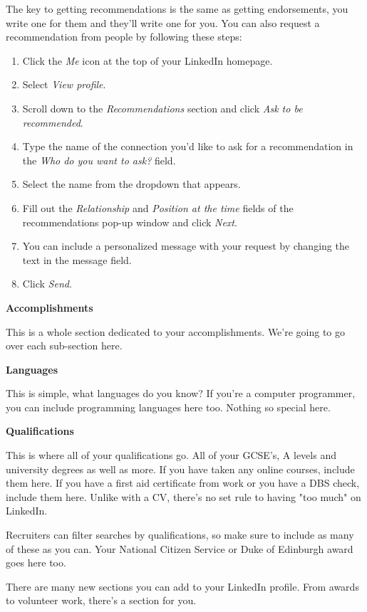 \documentclass{article}
\begin{document}
The key to getting recommendations is the same as getting endorsements,
you write one for them and they'll write one for you. You can also
request a recommendation from people by following these steps:

\begin{enumerate}
\def\labelenumi{\arabic{enumi}.}
\item
  Click the \emph{Me} icon at the top of your LinkedIn homepage.
\item
  Select \emph{View profile}.
\item
  Scroll down to the \emph{Recommendations} section and click \emph{Ask
  to be recommended}.
\item
  Type the name of the connection you'd like to ask for a recommendation
  in the \emph{Who do you want to ask?} field.
\item
  Select the name from the dropdown that appears.
\item
  Fill out the \emph{Relationship} and \emph{Position at the time}
  fields of the recommendations pop-up window and click \emph{Next}.
\item
  You can include a personalized message with your request by changing
  the text in the message field.
\item
  Click \emph{Send}.
\end{enumerate}

\textbf{Accomplishments}

This is a whole section dedicated to your accomplishments. We're going
to go over each sub-section here.

\textbf{Languages}

This is simple, what languages do you know? If you're a computer
programmer, you can include programming languages here too. Nothing so
special here.

\textbf{Qualifications}

This is where all of your qualifications go. All of your GCSE's, A
levels and university degrees as well as more. If you have taken any
online courses, include them here. If you have a first aid certificate
from work or you have a DBS check, include them here. Unlike with a CV,
there's no set rule to having "too much" on LinkedIn.

Recruiters can filter searches by qualifications, so make sure to
include as many of these as you can. Your National Citizen Service or
Duke of Edinburgh award goes here too.

There are many new sections you can add to your LinkedIn profile. From
awards to volunteer work, there's a section for you.
\end{document}
